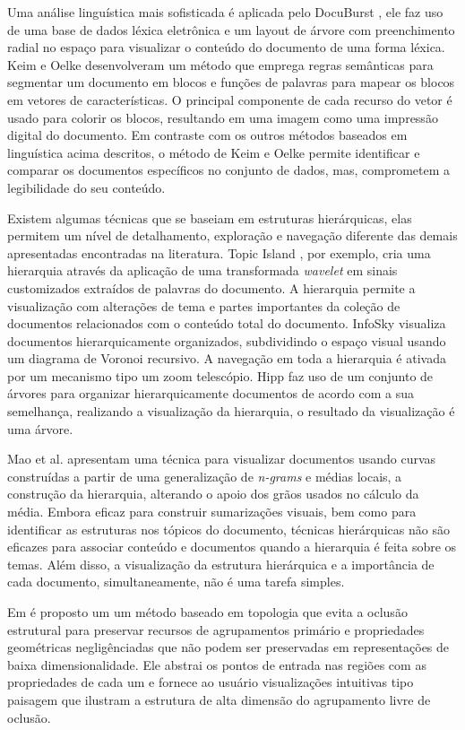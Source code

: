 Uma análise linguística mais sofisticada é aplicada pelo DocuBurst \cite{collins2009docuburst}, ele faz uso de uma base de dados léxica eletrônica e um layout de árvore com preenchimento radial no espaço para visualizar o conteúdo do documento de uma forma léxica. Keim e Oelke \cite{keim2007literature} desenvolveram um método que emprega regras semânticas para segmentar um documento em blocos e funções de palavras para mapear os blocos em vetores de características. O principal componente de cada recurso do vetor é usado para colorir os blocos, resultando em uma imagem como uma impressão digital do documento. Em contraste com os outros métodos  baseados em linguística acima descritos, o método de Keim e Oelke permite identificar e comparar os documentos específicos no conjunto de dados, mas, comprometem a legibilidade do seu conteúdo.

Existem algumas técnicas que se baseiam em estruturas hierárquicas, elas permitem um nível de detalhamento, exploração e navegação diferente das demais apresentadas encontradas na literatura. Topic Island \cite{miller1998topic}, por exemplo, cria uma hierarquia através da aplicação de uma transformada \textit{wavelet} em sinais customizados extraídos de palavras do documento. A hierarquia permite a visualização com alterações de tema e partes importantes da coleção de documentos relacionados com o conteúdo total do documento.
InfoSky \cite{andrews2002infosky} visualiza documentos hierarquicamente organizados, subdividindo o espaço visual usando um diagrama de Voronoi recursivo. A navegação em toda a hierarquia é ativada por um mecanismo tipo um zoom telescópio. Hipp \cite{paulovich2008hipp} faz uso de um conjunto de árvores para organizar hierarquicamente documentos de acordo com a sua semelhança, realizando a visualização da hierarquia, o resultado da visualização é uma árvore. 

Mao et al.\cite{mao2007sequential} apresentam uma técnica para visualizar documentos usando curvas construídas a partir de uma generalização de \emph{n-grams} e médias locais, a construção da hierarquia, alterando o apoio dos grãos usados no cálculo da média. Embora eficaz para construir sumarizações visuais, bem como para identificar as estruturas nos tópicos do documento, técnicas hierárquicas não são eficazes para associar conteúdo e documentos quando a hierarquia é feita sobre os temas. Além disso, a visualização da estrutura hierárquica e a importância de cada documento, simultaneamente, não é uma tarefa simples.

 Em \cite{oesterling2014topology} é proposto um um método baseado em topologia que evita a oclusão estrutural para preservar recursos de agrupamentos primário e propriedades geométricas negligênciadas que não podem ser preservadas em representações de baixa dimensionalidade. Ele abstrai os pontos de entrada nas regiões com as propriedades de cada um e fornece ao usuário visualizações intuitivas tipo paisagem que ilustram a estrutura de alta dimensão do agrupamento livre de oclusão.
 
